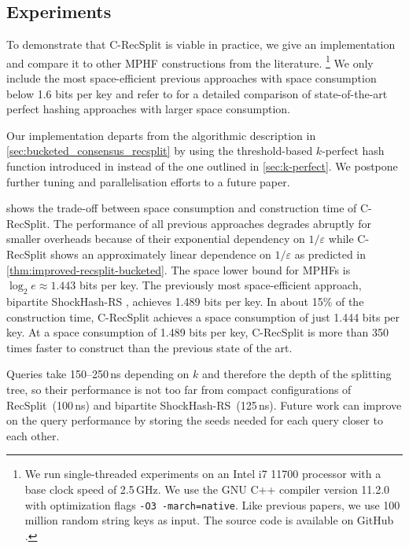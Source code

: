 \documentclass[cleveref,thm-restate]{lipics-v2021}
\def\consensus{\texorpdfstring{C\scalebox{0.8}{ONSENSUS}}{CONSENSUS}\xspace}
\begin{document}
\subsection{Experiments}
To demonstrate that \consensus-RecSplit is viable in practice, we give an implementation and compare it to other MPHF constructions from the literature.%
\footnote{We run single-threaded experiments on an Intel i7 11700 processor with a base clock speed of 2.5\,GHz.
We use the GNU C++ compiler version 11.2.0 with optimization flags \texttt{-O3 -march=native}.
Like previous papers, we use 100 million random string keys as input.
The source code is available on GitHub \cite{sourceCodeMphfExperiments,sourceCodeConsensusRecSplit}.
}
We only include the most space-efficient previous approaches with space consumption below 1.6 bits per key and refer to \cite{lehmann2024fast} for a detailed comparison of state-of-the-art perfect hashing approaches with larger space consumption.

Our implementation departs from the algorithmic description in \cref{sec:bucketed_consensus_recsplit} by using the threshold-based $k$-perfect hash function introduced in \cite{lehmann2024shockhash2} instead of the one outlined in \cref{sec:k-perfect}.
We postpone further tuning and parallelisation efforts to a future paper.

 shows the trade-off between space consumption and construction time of \consensus-RecSplit.
The performance of all previous approaches degrades abruptly for smaller overheads because of their exponential dependency on $1/\varepsilon$ while \consensus-RecSplit shows an approximately linear dependence on $1/ε$ as predicted in \cref{thm:improved-recsplit-bucketed}.
The space lower bound for MPHFs is $\log_2 e \approx 1.443$ bits per key.
The previously most space-efficient approach, bipartite ShockHash-RS \cite{lehmann2024shockhash2}, achieves 1.489 bits per key.
In about 15\% of the construction time, \consensus-RecSplit achieves a space consumption of just 1.444 bits per key.
At a space consumption of 1.489 bits per key, \consensus-RecSplit is more than 350 times faster to construct than the previous state of the art.

Queries take 150--250\,ns depending on $k$ and therefore the depth of the splitting tree, so their performance is not too far from compact configurations of RecSplit~(100\,ns) and bipartite ShockHash-RS~(125\,ns).
Future work can improve on the query performance by storing the seeds needed for each query closer to each other.
\end{document}
